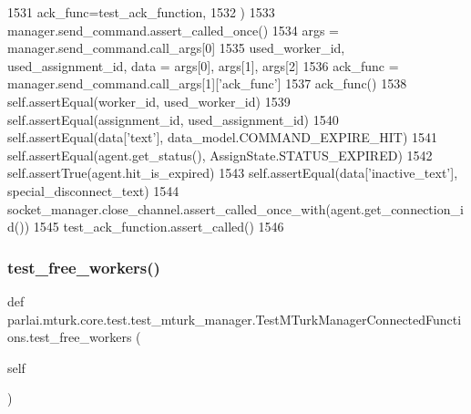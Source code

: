 \begin{DoxyCode}
1531             ack\_func=test\_ack\_function,
1532         )
1533         manager.send\_command.assert\_called\_once()
1534         args = manager.send\_command.call\_args[0]
1535         used\_worker\_id, used\_assignment\_id, data = args[0], args[1], args[2]
1536         ack\_func = manager.send\_command.call\_args[1][\textcolor{stringliteral}{'ack\_func'}]
1537         ack\_func()
1538         self.assertEqual(worker\_id, used\_worker\_id)
1539         self.assertEqual(assignment\_id, used\_assignment\_id)
1540         self.assertEqual(data[\textcolor{stringliteral}{'text'}], data\_model.COMMAND\_EXPIRE\_HIT)
1541         self.assertEqual(agent.get\_status(), AssignState.STATUS\_EXPIRED)
1542         self.assertTrue(agent.hit\_is\_expired)
1543         self.assertEqual(data[\textcolor{stringliteral}{'inactive\_text'}], special\_disconnect\_text)
1544         socket\_manager.close\_channel.assert\_called\_once\_with(agent.get\_connection\_id())
1545         test\_ack\_function.assert\_called()
1546 
\end{DoxyCode}
\mbox{\label{classparlai_1_1mturk_1_1core_1_1test_1_1test__mturk__manager_1_1TestMTurkManagerConnectedFunctions_a3fc7e58309094d8c88686062e87f58b4}} 
\subsubsection{\texorpdfstring{test\+\_\+free\+\_\+workers()}{test\_free\_workers()}}
{\footnotesize\ttfamily def parlai.\+mturk.\+core.\+test.\+test\+\_\+mturk\+\_\+manager.\+Test\+M\+Turk\+Manager\+Connected\+Functions.\+test\+\_\+free\+\_\+workers (\begin{DoxyParamCaption}\item[{}]{self }\end{DoxyParamCaption})}



